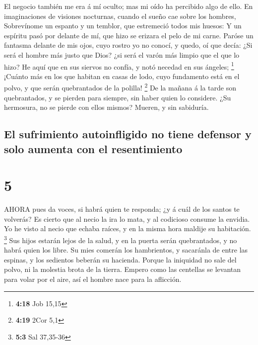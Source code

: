  El negocio también me era á mí oculto; mas mi oído ha
percibido algo de ello.  En imaginaciones de visiones
nocturnas, cuando el sueño cae sobre los hombres, 
Sobrevínome un espanto y un temblor, que estremeció todos mis huesos:
 Y un espíritu pasó por delante de mí, que hizo se erizara
el pelo de mi carne.  Paróse un fantasma delante de mis
ojos, cuyo rostro yo no conocí, y quedo, oí que decía:  ¿Si
será el hombre más justo que Dios? ¿si será el varón más limpio que el
que lo hizo?  He aquí que en sus siervos no confía, y notó
necedad en sus ángeles; \footnote{\textbf{4:18} Job 15,15} 
¡Cuánto más en los que habitan en casas de lodo, cuyo fundamento está en
el polvo, y que serán quebrantados de la polilla! \footnote{\textbf{4:19}
  2Cor 5,1}  De la mañana á la tarde son quebrantados, y se
pierden para siempre, sin haber quien lo considere.  ¿Su
hermosura, no se pierde con ellos mismos? Mueren, y sin sabiduría.

\hypertarget{el-sufrimiento-autoinfligido-no-tiene-defensor-y-solo-aumenta-con-el-resentimiento}{%
\subsection{El sufrimiento autoinfligido no tiene defensor y solo
aumenta con el
resentimiento}\label{el-sufrimiento-autoinfligido-no-tiene-defensor-y-solo-aumenta-con-el-resentimiento}}

\hypertarget{section-4}{%
\section{5}\label{section-4}}

 AHORA pues da voces, si habrá quien te responda; ¿y á cuál
de los santos te volverás?  Es cierto que al necio la ira lo
mata, y al codicioso consume la envidia.  Yo he visto al
necio que echaba raíces, y en la misma hora maldije su habitación.
\footnote{\textbf{5:3} Sal 37,35-36}  Sus hijos estarán
lejos de la salud, y en la puerta serán quebrantados, y no habrá quien
los libre.  Su mies comerán los hambrientos, y sacaránla de
entre las espinas, y los sedientos beberán su hacienda. 
Porque la iniquidad no sale del polvo, ni la molestia brota de la
tierra.  Empero como las centellas se levantan para volar
por el aire, así el hombre nace para la aflicción.

